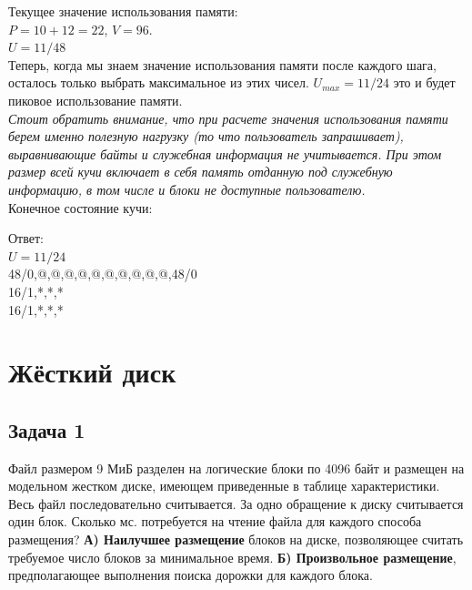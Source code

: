 \documentclass[12pt, letterpaper]{article}
\begin{document}
Текущее значение использования памяти:\\
$P=10 + 12 = 22$, $V=96$.\\ 
$U=11/48$\\

Теперь, когда мы знаем значение использования памяти после каждого шага, осталось только выбрать максимальное из этих чисел. $U_{max}=11/24$ это и будет пиковое использование памяти.\\
\textit{Стоит обратить внимание, что при расчете значения использования памяти берем именно полезную нагрузку (то что пользователь запрашивает), выравнивающие байты и служебная информация не учитывается. При этом размер всей кучи включает в себя память отданную под служебную информацию, в том числе и блоки не доступные пользователю.}\\
Конечное состояние кучи:
\begin{center}
\end{center}
Ответ:\\
$U=11/24$\\
48/0,@,@,@,@,@,@,@,@,@,@,48/0 \\
16/1,*,*,*\\
16/1,*,*,*
\newpage
\section{Жёсткий диск}
\subsection{Задача 1}
Файл размером 9 МиБ разделен на логические блоки по 4096 байт и размещен на модельном жестком диске, имеющем приведенные в таблице характеристики. Весь файл последовательно считывается. За одно обращение к диску считывается один блок. Сколько мс. потребуется на чтение файла для каждого способа размещения? \textbf{А) Наилучшее размещение} блоков на диске, позволяющее считать требуемое число блоков за минимальное время. \textbf{Б) Произвольное размещение}, предполагающее выполнения поиска дорожки для каждого блока.\\
\end{document}
